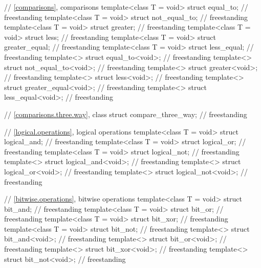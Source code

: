 \begin{codeblock}
{  // \ref{comparisons}, comparisons
  template<class T = void> struct equal_to;                                         // freestanding
  template<class T = void> struct not_equal_to;                                     // freestanding
  template<class T = void> struct greater;                                          // freestanding
  template<class T = void> struct less;                                             // freestanding
  template<class T = void> struct greater_equal;                                    // freestanding
  template<class T = void> struct less_equal;                                       // freestanding
  template<> struct equal_to<void>;                                                 // freestanding
  template<> struct not_equal_to<void>;                                             // freestanding
  template<> struct greater<void>;                                                  // freestanding
  template<> struct less<void>;                                                     // freestanding
  template<> struct greater_equal<void>;                                            // freestanding
  template<> struct less_equal<void>;                                               // freestanding

  // \ref{comparisons.three.way}, class 
  struct compare_three_way;                                                         // freestanding

  // \ref{logical.operations}, logical operations
  template<class T = void> struct logical_and;                                      // freestanding
  template<class T = void> struct logical_or;                                       // freestanding
  template<class T = void> struct logical_not;                                      // freestanding
  template<> struct logical_and<void>;                                              // freestanding
  template<> struct logical_or<void>;                                               // freestanding
  template<> struct logical_not<void>;                                              // freestanding

  // \ref{bitwise.operations}, bitwise operations
  template<class T = void> struct bit_and;                                          // freestanding
  template<class T = void> struct bit_or;                                           // freestanding
  template<class T = void> struct bit_xor;                                          // freestanding
  template<class T = void> struct bit_not;                                          // freestanding
  template<> struct bit_and<void>;                                                  // freestanding
  template<> struct bit_or<void>;                                                   // freestanding
  template<> struct bit_xor<void>;                                                  // freestanding
  template<> struct bit_not<void>;                                                  // freestanding

}
\end{codeblock}
